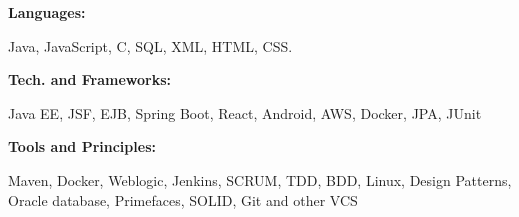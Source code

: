     \begin{minipage}[t]{0.2\textwidth}
        \textbf{Languages:}
    \end{minipage}
    \hfill
    \begin{minipage}[t]{0.73\textwidth}
      Java, JavaScript, C, SQL, XML, HTML, CSS.  
    \end{minipage}
    \vspace{3mm}
    
    \begin{minipage}[t]{0.2\textwidth}
        \textbf{Tech. and Frameworks:}
    \end{minipage}
    \hfill
    \begin{minipage}[t]{0.73\textwidth}
      Java EE, JSF, EJB, Spring Boot, React, Android, AWS, Docker, JPA, JUnit
    \end{minipage}
    \vspace{3mm}

    \begin{minipage}[t]{0.2\textwidth}
        \textbf{Tools and Principles:}
    \end{minipage}
    \hfill
    \begin{minipage}[t]{0.73\textwidth}
      Maven, Docker, Weblogic, Jenkins, SCRUM, TDD, BDD, Linux, Design Patterns, Oracle database, Primefaces, SOLID, Git and other VCS
    \end{minipage}


      

